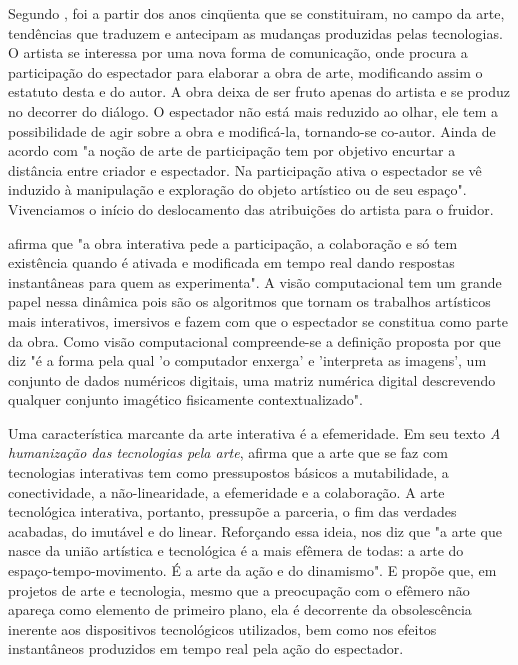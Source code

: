 Segundo , foi a partir dos anos cinqüenta que se constituiram, no campo da arte, tendências que traduzem e antecipam as mudanças produzidas pelas tecnologias. O artista se interessa por uma nova forma de comunicação, onde procura a participação do espectador para elaborar a obra de arte, modificando assim o estatuto desta e do autor. A obra deixa de ser fruto apenas do artista e se produz no decorrer do diálogo. O espectador não está mais reduzido ao olhar, ele tem a possibilidade de agir sobre a obra e modificá-la, tornando-se co-autor. Ainda de acordo com  "a noção de arte de participação tem por objetivo encurtar a distância entre criador e espectador. Na participação ativa o espectador se vê induzido à manipulação e exploração do objeto artístico ou de seu espaço". Vivenciamos o início do deslocamento das atribuições do artista para o fruidor. 

 afirma que "a obra interativa pede a participação, a colaboração e só tem existência quando é ativada e modificada em tempo real dando respostas instantâneas para quem as experimenta". A visão computacional tem um grande papel nessa dinâmica pois são os algoritmos que tornam os trabalhos artísticos mais interativos, imersivos e fazem com que o espectador se constitua como parte da obra. Como visão computacional compreende-se a definição proposta por  que diz "é a forma pela qual 'o computador enxerga' e 'interpreta as imagens', um conjunto de dados numéricos digitais, uma matriz numérica digital descrevendo qualquer conjunto imagético fisicamente contextualizado".

Uma característica marcante da arte interativa é a efemeridade. Em seu texto \textit{A humanização das tecnologias pela arte},  afirma que a arte que se faz com tecnologias interativas tem como pressupostos básicos a mutabilidade, a conectividade, a não-linearidade, a efemeridade e a colaboração. A arte tecnológica interativa, portanto, pressupõe a parceria, o fim das verdades acabadas, do imutável e do linear. Reforçando essa ideia,  nos diz que "a arte que nasce da união artística e tecnológica é a mais efêmera de todas: a arte do espaço-tempo-movimento. É a arte da ação e do dinamismo". E  propõe que, em projetos de arte e tecnologia, mesmo que a preocupação com o efêmero não apareça como elemento de primeiro plano, ela é decorrente da obsolescência inerente aos dispositivos tecnológicos utilizados, bem como nos efeitos instantâneos produzidos em tempo real pela ação do espectador.

